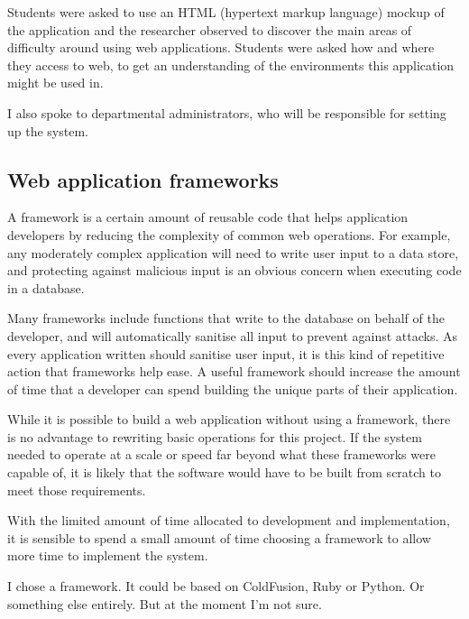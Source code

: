 \documentclass[]{scrartcl}
\begin{document}
Students were asked to use an HTML (hypertext markup language) mockup of the
application and the researcher observed to discover the main areas of
difficulty around using web applications. Students were asked how and where
they access to web, to get an understanding of the environments this
application might be used in.


I also spoke to departmental administrators, who will be responsible for setting up
the system.


\subsection{Web application frameworks}

A framework is a certain amount of reusable code that helps application developers by reducing the complexity of common web operations. For example, any moderately complex application will need to write user input to a data store, and protecting against malicious input is an obvious concern when executing code in a database.

Many frameworks include functions that write to the database on behalf of the developer, and will automatically sanitise all input to prevent against attacks. As every application written should sanitise user input, it is this kind of repetitive action that frameworks help ease. A useful framework should increase the amount of time that a developer can spend building the unique parts of their application.

While it is possible to build a web application without using a framework, there is no advantage to rewriting basic operations for this project. If the system needed to operate at a scale or speed far beyond what these frameworks were capable of, it is likely that the software would have to be built from scratch to meet those requirements.

With the limited amount of time allocated to development and implementation, it is sensible to spend a small amount of time choosing a framework to allow more time to implement the system.


I chose a framework. It could be based on ColdFusion, Ruby or Python. Or something else entirely. But at the moment I'm not sure.
\end{document}
